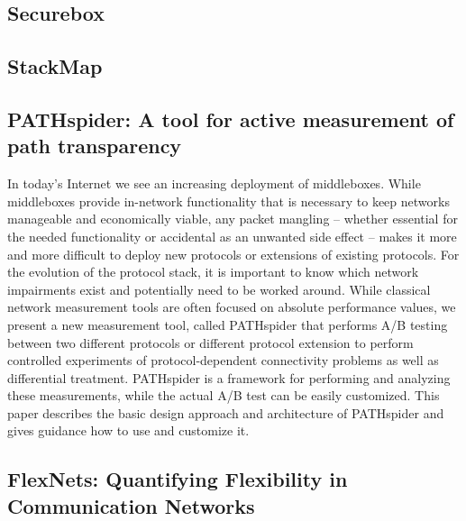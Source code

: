 \subsection{Securebox}

\subsection{StackMap}

\subsection{PATHspider: A tool for active measurement of path transparency}

In today’s Internet we see an increasing deployment of middleboxes. While 
middleboxes provide in-network functionality that is necessary to keep 
networks manageable and economically viable, any packet mangling – whether 
essential for the needed functionality or accidental as an unwanted side 
effect – makes it more and more difficult to deploy new protocols or 
extensions of existing protocols. For the evolution of the protocol stack, 
it is important to know which network impairments exist and potentially 
need to be worked around. While classical network measurement tools are 
often focused on absolute performance values, we present a new measurement 
tool, called PATHspider that performs A/B testing between two different 
protocols or different protocol extension to perform controlled experiments 
of protocol-dependent connectivity problems as well as differential treatment. 
PATHspider is a framework for performing and analyzing these measurements, 
while the actual A/B test can be easily customized. This paper describes the 
basic design approach and architecture of PATHspider and gives guidance how 
to use and customize it.

\subsection{FlexNets: Quantifying Flexibility in Communication Networks}

